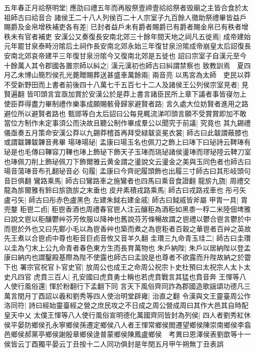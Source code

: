 五年春正月祫祭明堂|{
	應劭曰禮五年而再殷祭壹禘壹祫祫祭者毁廟之主皆合食於太祖師古曰祫音合}
諸侯王二十八人列侯百二十人宗室子九百餘人徵助祭禮畢皆益戶賜爵及金帛增秩補吏各有差|{
	已封者益戶未有爵者賜爵已有爵者賜金帛已有秩者增秩未有官者補吏}
安漢公又奏復長安南北郊三十餘年間天地之祠凡五徙焉|{
	成帝建始元年罷甘泉泰畤汾隂后土祠作長安南北郊永始三年復甘泉汾隂成帝崩皇太后詔復長安南北郊哀帝建平三年復甘泉汾隂今又復南北郊是五徙也}
詔曰宗室子自漢元至今十餘萬人其令郡國各置宗師以糾之|{
	漢元漢初也師古曰糾謂禁察也}
致教訓焉　夏四月乙未博山簡烈侯孔光薨贈賜葬送甚盛車萬餘兩|{
	兩音亮}
以馬宮為太師　吏民以莽不受新野田而上書者前後四十八萬七千五百七十二人及諸侯王公列侯宗室見者|{
	見賢遍翻}
皆叩頭言宜亟加賞於安漢公於是莽上書言諸臣民所上章下議者事皆寑勿上使臣莽得盡力畢制禮作樂事成願賜骸骨歸家避賢者路|{
	言久處大位妨賢者進用之路避位所以避賢者路也}
甄邯等白太后詔曰公每見輒流涕叩頭言願不受賞賞即加不敢當位方制作未定事須公而決故且聽公制作畢成羣公以聞究于前議|{
	究竟也}
其九錫禮儀亟奏五月策命安漢公莽以九錫莽稽首再拜受緑韍衮冕衣裳|{
	師古曰此韍謂蔽膝也或謂韍韠韍韠音弗畢}
瑒琫瑒珌|{
	孟康曰瑒玉名也佩刀之飾上曰琫下曰珌詩云鞞琫有珌是也毛傳曰鞸容刀鞸也琫上飾珌下飾天子玉琫而珧珌諸侯璗琫而璆珌陸云鞞刀室也琫佩刀削上飾珌佩刀下飾爾雅云黄金謂之璗說文云璗金之美與玉同色者也師古曰瑒音蕩琫音布孔翻珌音必}
句履|{
	孟康曰今齊祀履頭飾也出履三寸師古曰其形岐頭句音巨俱翻}
鸞路乘馬|{
	師古曰鸞路車之施鸞者也四馬曰乘音食證翻}
龍旂九旒|{
	周禮交龍為旂爾雅有鈴曰旂旒旂之末垂也}
皮弁素積戎路乘馬|{
	師古曰戎路戎車也}
彤弓矢盧弓矢|{
	師古曰彤赤色盧黑色}
左建朱鉞右建金戚|{
	師古曰鉞戚皆斧屬}
甲胄一具|{
	胄兜鍪}
秬鬯二卣|{
	秬鬯香酒也周禮春官鬯人注云釀秬為酒秬如黑黍一稃二米陸佃埤雅曰說文鬯以秬釀鬱艸芬芳攸服以降神也舊說芬芳條暢故謂之鬯禮以鬱合鬯言鬱於中而鬯於外也又曰先鄭小毛以為鬯香艸也築而煮之為鬯秬者百穀之華鬯者百艸之英故先王煮以合鬯卣中尊也秬音巨卣音攸又音羊久翻}
圭瓚三九命青玉珪二|{
	師古曰圭瓚以圭為勺末上公九命青者春色東方生而長育萬物也}
朱戶納陛|{
	朱戶以居納陛以登孟康曰納内也謂鑿殿基際為陛不使露也師古曰孟說是也尊者不欲露而升陛故納之於霤下也}
署宗官祝官卜官史官|{
	放周公也成王之命周公祝宗卜史杜預曰太祝宗人太卜太史凡四官}
虎賁三百人|{
	孔安國曰虎賁勇士稱也若虎賁戰言其猛也賁音奔}
王惲等八人使行風俗還|{
	惲於粉翻行下孟翻下同}
言天下風俗齊同詐為郡國造歌謡頌功德凡三萬言閏月丁酉詔以羲和劉秀等四人使治明堂辟雍|{
	治直之翻}
令漢與文王靈臺周公作洛同符|{
	詩曰經始靈臺經之營之庶民攻之不日成之周公營成周曰其作大邑其自時配皇天中乂}
太僕王惲等八人使行風俗宣明德化萬國齊同皆封為列侯|{
	四人者劉秀紅休侯平晏防鄉侯孔永寧鄉侯孫遷定鄉侯八人者王惲常鄉侯閻遷望鄉侯陳崇南鄉侯李翕邑鄉侯郝黨亭鄉侯謝殷章鄉侯逯普蒙鄉侯陳鳳盧鄉侯　考異曰恩澤侯表劉歆等十一侯皆云丁酉獨平晏云丁丑按十二人同功俱封是年閏五月甲午朔無丁丑表誤}
